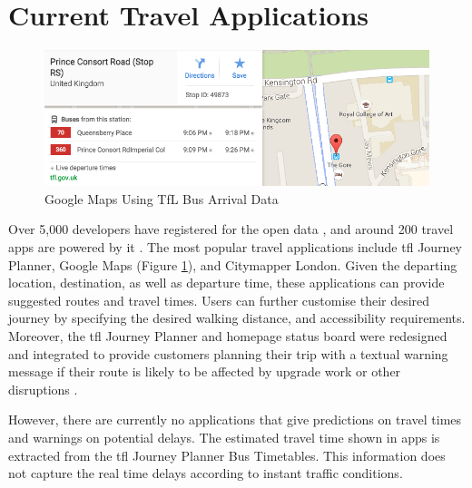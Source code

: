 \section{Current Travel Applications}

\begin{figure}
\centering
\includegraphics[width=1\textwidth]{figures/google_maps_tfl_data.png}
\caption{\label{fig:google_maps_tfl_data} Google Maps Using TfL Bus Arrival Data}
\end{figure}

Over 5,000 developers have registered for the open data \cite{open_data}, and around 200 travel apps are powered by it \cite{tfl_annual_report_13/14}. The most popular travel applications include \acrshort{tfl} Journey Planner, Google Maps (Figure \ref{fig:google_maps_tfl_data}), and Citymapper London. Given the departing location, destination, as well as departure time, these applications can provide suggested routes and travel times. Users can further customise their desired journey by specifying the desired walking distance, and accessibility requirements. Moreover, the \acrshort{tfl} Journey Planner and homepage status board were redesigned and integrated to provide customers planning their trip with a textual warning message if their route is likely to be affected by upgrade work or other disruptions \cite{tfl_annual_report_13/14}.

\par However, there are currently no applications that give predictions on travel times and warnings on potential delays. The estimated travel time shown in apps is extracted from the \acrshort{tfl} Journey Planner Bus Timetables. This information does not capture the real time delays according to instant traffic conditions.
